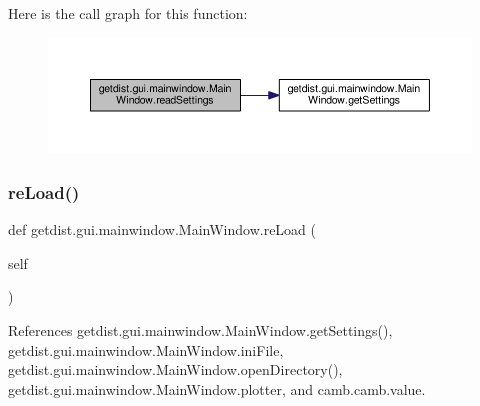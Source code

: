 Here is the call graph for this function\+:
\nopagebreak
\begin{figure}[H]
\begin{center}
\leavevmode
\includegraphics[width=350pt]{classgetdist_1_1gui_1_1mainwindow_1_1MainWindow_a7e29a3ab6b2531c8680823bd4ae26c1d_cgraph}
\end{center}
\end{figure}
\mbox{\label{classgetdist_1_1gui_1_1mainwindow_1_1MainWindow_ad64925d8336c287f82ae6e2f16d9de71}} 
\subsubsection{\texorpdfstring{re\+Load()}{reLoad()}}
{\footnotesize\ttfamily def getdist.\+gui.\+mainwindow.\+Main\+Window.\+re\+Load (\begin{DoxyParamCaption}\item[{}]{self }\end{DoxyParamCaption})}



References getdist.\+gui.\+mainwindow.\+Main\+Window.\+get\+Settings(), getdist.\+gui.\+mainwindow.\+Main\+Window.\+ini\+File, getdist.\+gui.\+mainwindow.\+Main\+Window.\+open\+Directory(), getdist.\+gui.\+mainwindow.\+Main\+Window.\+plotter, and camb.\+camb.\+value.

